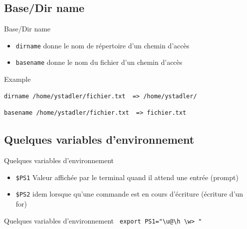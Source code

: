 \def\subsectitle{Base/Dir name}
\subsection{\subsectitle}
\begin{frame}[containsverbatim]{\sectitle}
\begin{block}{\subsectitle}
\begin{itemize}
\item \verb!dirname! donne le nom de répertoire d'un chemin d'accès
\item \verb!basename! donne le nom du fichier d'un chemin d'accès 
\end{itemize}
\end{block}

\def\subsectitle{Example}
\begin{block}{\subsectitle}
\begin{verbatim}
dirname /home/ystadler/fichier.txt  => /home/ystadler/
\end{verbatim}


\begin{verbatim}
basename /home/ystadler/fichier.txt  => fichier.txt
\end{verbatim}


\end{block}
\end{frame}

\def\subsectitle{Quelques variables d'environnement}
\subsection{\subsectitle}
\begin{frame}[containsverbatim]{\sectitle}
\begin{block}{\subsectitle}
\begin{itemize}
\item \verb!$PS1! Valeur affichée par le terminal quand il attend une entrée (prompt)
\item \verb!$PS2! idem lorsque qu'une commande est en cours d'écriture (écriture d'un for)
\end{itemize}
\end{block}

\begin{block}{\subsectitle}
\verb! export PS1="\u@\h \w> "!
\end{block}
\end{frame}




\def\subsectitle{Rappels}
